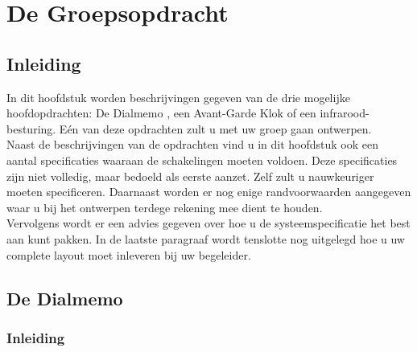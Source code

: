 \section{De Groepsopdracht}

\subsection{Inleiding}

In dit hoofdstuk worden beschrijvingen gegeven van de drie mogelijke 
hoofdopdrachten: De Dialmemo , een Avant-Garde Klok of een infrarood-besturing.
E\'en van deze opdrachten zult u met uw groep gaan ontwerpen.\\
Naast de beschrijvingen van de opdrachten vind u in dit hoofdstuk ook een
aantal specificaties waaraan de schakelingen moeten voldoen. 
Deze specificaties zijn niet volledig, maar bedoeld als eerste aanzet. 
Zelf zult u nauwkeuriger moeten specificeren. Daarnaast worden er nog
 enige randvoorwaarden aangegeven waar u bij het ontwerpen terdege 
rekening mee dient te houden.\\
Vervolgens wordt er een advies gegeven over hoe u de systeemspecificatie 
het best aan kunt pakken. In de laatste paragraaf wordt tenslotte nog 
uitgelegd hoe u uw complete layout moet inleveren bij uw begeleider.

\subsection{De Dialmemo}

\subsubsection{Inleiding}


